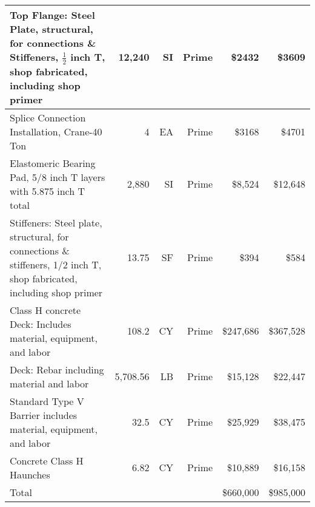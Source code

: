 \begin{table}[H]
{\begin{tabular}{p{5cm} r r r r r}
Top Flange: Steel Plate, structural, for connections \&  Stiffeners, \(\frac{1}{2}\) inch T, shop fabricated, including shop primer & 12,240            & SI            & Prime               & \$2432               & \$3609                       \\ \midrule
Splice Connection Installation, Crane-40 Ton                                                                                        & 4                 & EA            & Prime               & \$3168               & \$4701                        \\ \midrule
Elastomeric Bearing Pad, 5/8 inch T layers with 5.875 inch T total                                                                  & 2,880             & SI            & Prime               & \$8,524              & \$12,648                       \\ \midrule
Stiffeners: Steel plate, structural, for connections \& stiffeners, 1/2 inch T, shop fabricated, including shop primer              & 13.75             & SF            & Prime               & \$394                & \$584                           \\ \midrule
Class H concrete Deck: Includes material, equipment, and labor                                                                      & 108.2             & CY            & Prime               & \$247,686            & \$367,528                        \\ \midrule
Deck: Rebar including material and labor                                                                                            & 5,708.56          & LB            & Prime               & \$15,128             & \$22,447                          \\ \midrule
Standard Type V Barrier includes material, equipment, and labor                                                                     & 32.5              & CY            & Prime               & \$25,929             & \$38,475                           \\ \midrule
Concrete Class H Haunches                                                                                                           & 6.82              & CY            & Prime               & \$10,889             & \$16,158                            \\ \midrule
Total                                                                                                                               &                   &               &                     & \$660,000            & \$985,000                            \\ \bottomrule
\end{tabular}}
\end{table}

